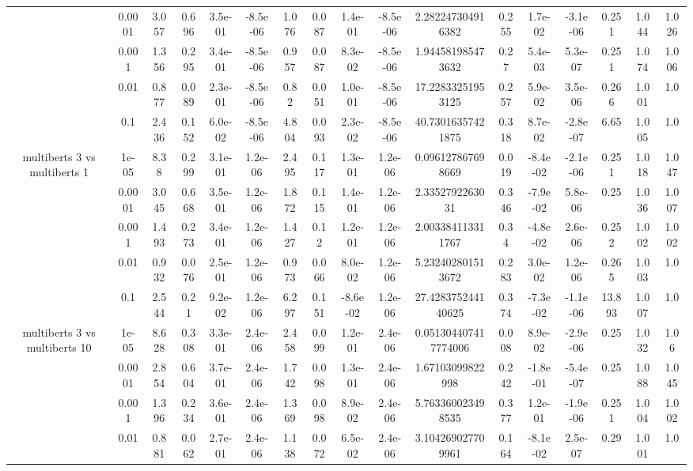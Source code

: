 \begin{tabular}{|c|c|c|c|c|c|c|c|c|c|c|c|c|c|c|c|c|}
 & 0.0001 & 3.057 & 0.696 & 3.5e-01 & -8.5e-06 & 1.076 & 0.087 & 1.4e-01 & -8.5e-06 & 2.282247304916382 & 0.255 & 1.7e-02 & -3.1e-06 & 0.251 & 1.044 & 1.026 \\
 & 0.001 & 1.356 & 0.295 & 3.4e-01 & -8.5e-06 & 0.957 & 0.087 & 8.3e-02 & -8.5e-06 & 1.944581985473632 & 0.27 & 5.4e-03 & 5.3e-07 & 0.251 & 1.074 & 1.006 \\
 & 0.01 & 0.877 & 0.089 & 2.3e-01 & -8.5e-06 & 0.82 & 0.051 & 1.0e-01 & -8.5e-06 & 17.22833251953125 & 0.257 & 5.9e-02 & 3.5e-06 & 0.266 & 1.001 & 1.0 \\
 & 0.1 & 2.436 & 0.152 & 6.0e-02 & -8.5e-06 & 4.804 & 0.093 & 2.3e-02 & -8.5e-06 & 40.73016357421875 & 0.318 & 8.7e-02 & -2.8e-07 & 6.65 & 1.005 & 1.0 \\
\hline
\multirow{5}{*}{multiberts 3 vs multiberts 1} & 1e-05 & 8.38 & 0.299 & 3.1e-01 & 1.2e-06 & 2.495 & 0.117 & 1.3e-01 & 1.2e-06 & 0.096127867698669 & 0.019 & -8.4e-02 & -2.1e-06 & 0.251 & 1.018 & 1.047 \\
 & 0.0001 & 3.045 & 0.668 & 3.5e-01 & 1.2e-06 & 1.872 & 0.115 & 1.4e-01 & 1.2e-06 & 2.3352792263031 & 0.346 & -7.9e-02 & 5.8e-06 & 0.25 & 1.036 & 1.007 \\
 & 0.001 & 1.493 & 0.273 & 3.4e-01 & 1.2e-06 & 1.427 & 0.12 & 1.2e-01 & 1.2e-06 & 2.003384113311767 & 0.34 & -4.8e-02 & 2.6e-06 & 0.252 & 1.002 & 1.002 \\
 & 0.01 & 0.932 & 0.076 & 2.5e-01 & 1.2e-06 & 0.973 & 0.066 & 8.0e-02 & 1.2e-06 & 5.232402801513672 & 0.283 & 3.0e-02 & 1.2e-06 & 0.265 & 1.003 & 1.0 \\
 & 0.1 & 2.544 & 0.21 & 9.2e-02 & 1.2e-06 & 6.297 & 0.151 & -8.6e-02 & 1.2e-06 & 27.428375244140625 & 0.374 & -7.3e-02 & -1.1e-06 & 13.893 & 1.007 & 1.0 \\
\hline
\multirow{5}{*}{multiberts 3 vs multiberts 10} & 1e-05 & 8.628 & 0.308 & 3.3e-01 & 2.4e-06 & 2.458 & 0.099 & 1.2e-01 & 2.4e-06 & 0.051304407417774006 & 0.008 & 8.9e-02 & -2.9e-06 & 0.25 & 1.032 & 1.06 \\
 & 0.0001 & 2.854 & 0.604 & 3.7e-01 & 2.4e-06 & 1.742 & 0.098 & 1.3e-01 & 2.4e-06 & 1.67103099822998 & 0.242 & -1.8e-01 & -5.4e-07 & 0.25 & 1.088 & 1.045 \\
 & 0.001 & 1.396 & 0.234 & 3.6e-01 & 2.4e-06 & 1.369 & 0.098 & 8.9e-02 & 2.4e-06 & 5.763360023498535 & 0.377 & 1.2e-01 & -1.9e-06 & 0.251 & 1.004 & 1.002 \\
 & 0.01 & 0.881 & 0.062 & 2.7e-01 & 2.4e-06 & 1.138 & 0.072 & 6.5e-02 & 2.4e-06 & 3.104269027709961 & 0.164 & -8.1e-02 & 2.5e-07 & 0.29 & 1.001 & 1.0 \\

\end{tabular}
